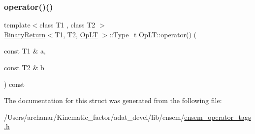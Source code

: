 \mbox{\label{structOpLT_a2f128753d950366b68138d206e76ceec}} 
\subsubsection{\texorpdfstring{operator()()}{operator()()}\hspace{0.1cm}{\footnotesize\ttfamily [2/2]}}
{\footnotesize\ttfamily template$<$class T1 , class T2 $>$ \\
\mbox{\hyperlink{structBinaryReturn}{Binary\+Return}}$<$T1, T2, \mbox{\hyperlink{structOpLT}{Op\+LT}} $>$\+::Type\+\_\+t Op\+L\+T\+::operator() (\begin{DoxyParamCaption}\item[{const T1 \&}]{a,  }\item[{const T2 \&}]{b }\end{DoxyParamCaption}) const\hspace{0.3cm}{\ttfamily [inline]}}



The documentation for this struct was generated from the following file\+:\begin{DoxyCompactItemize}
\item 
/\+Users/archanar/\+Kinematic\+\_\+factor/adat\+\_\+devel/lib/ensem/\mbox{\hyperlink{lib_2ensem_2ensem__operator__tags_8h}{ensem\+\_\+operator\+\_\+tags.\+h}}\end{DoxyCompactItemize}

